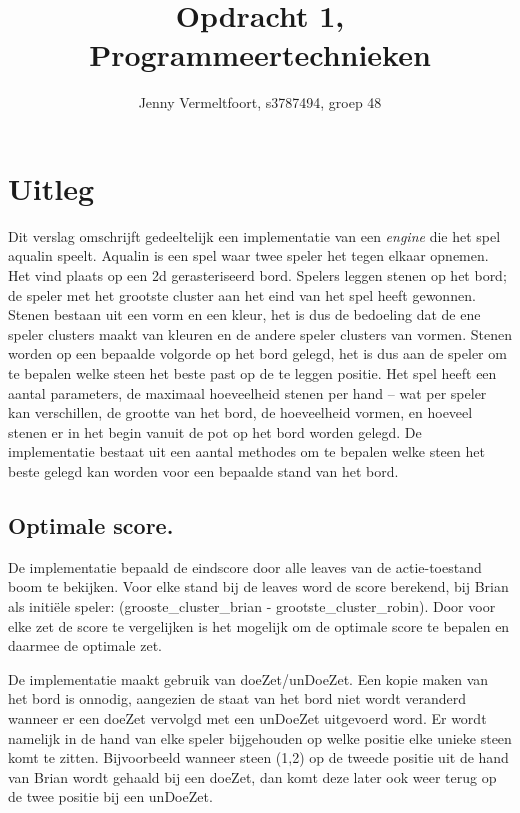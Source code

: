 \documentclass[10pt]{article}
\title{Opdracht 1, Programmeertechnieken}
\author{Jenny Vermeltfoort, s3787494, groep 48}
\begin{document}
\def\tablename{Tabel}

\maketitle

\section{Uitleg}
Dit verslag omschrijft gedeeltelijk een implementatie van een \textit{engine} die het spel aqualin speelt. 
Aqualin is een spel waar twee speler het tegen elkaar opnemen.
Het vind plaats op een 2d gerasteriseerd bord.
Spelers leggen stenen op het bord; de speler met het grootste cluster aan het eind van het spel heeft gewonnen.
Stenen bestaan uit een vorm en een kleur, het is dus de bedoeling dat de ene speler clusters maakt van kleuren en de andere speler clusters van vormen.
Stenen worden op een bepaalde volgorde op het bord gelegd, het is dus aan de speler om te bepalen welke steen het beste past op de te leggen positie.
Het spel heeft een aantal parameters, de maximaal hoeveelheid stenen per hand – wat per speler kan verschillen, de grootte van het bord, de hoeveelheid vormen, en hoeveel stenen er in het begin vanuit de pot op het bord worden gelegd. De implementatie bestaat uit een aantal methodes om te bepalen welke steen het beste gelegd kan worden voor een bepaalde stand van het bord.


\subsection{Optimale score.}
De implementatie bepaald de eindscore door alle leaves van de actie-toestand boom te bekijken.
Voor elke stand bij de leaves word de score berekend, bij Brian als initi\"ele speler: (grooste\_cluster\_brian - grootste\_cluster\_robin).
Door voor elke zet de score te vergelijken is het mogelijk om de optimale score te bepalen en daarmee de optimale zet.

De implementatie maakt gebruik van doeZet/unDoeZet. 
Een kopie maken van het bord is onnodig, aangezien de staat van het bord niet wordt veranderd wanneer er een doeZet vervolgd met een unDoeZet uitgevoerd word. 
Er wordt namelijk in de hand van elke speler bijgehouden op welke positie elke unieke steen komt te zitten. Bijvoorbeeld wanneer steen (1,2) op de tweede positie uit de hand van Brian wordt gehaald bij een doeZet, dan komt deze later ook weer terug op de twee positie bij een unDoeZet.
\end{document}
